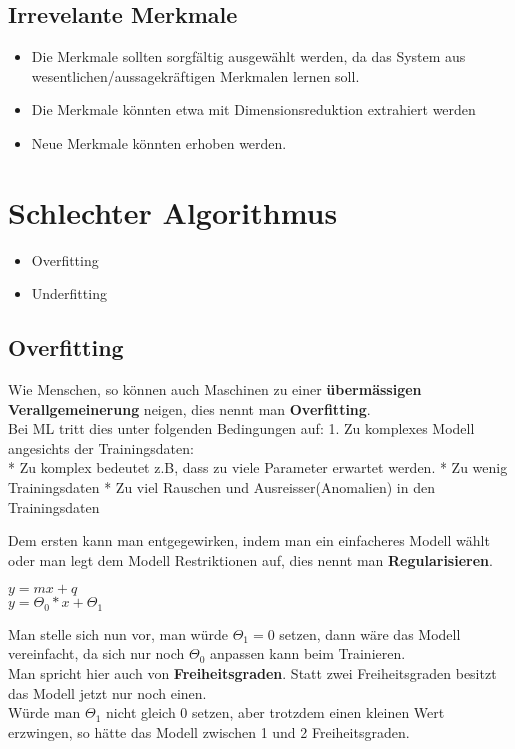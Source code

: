 \documentclass[11pt]{article}
\providecommand{\tightlist}{%
      \setlength{\itemsep}{0pt}\setlength{\parskip}{0pt}}
\begin{document}
\subsection{Irrevelante Merkmale}\label{irrevelante-merkmale}

\begin{itemize}
\tightlist
\item
  Die Merkmale sollten sorgfältig ausgewählt werden, da das System aus
  wesentlichen/aussagekräftigen Merkmalen lernen soll.\\
\item
  Die Merkmale könnten etwa mit Dimensionsreduktion extrahiert werden
\item
  Neue Merkmale könnten erhoben werden.
\end{itemize}

    \section{Schlechter Algorithmus}\label{schlechter-algorithmus}

\begin{itemize}
\tightlist
\item
  Overfitting
\item
  Underfitting
\end{itemize}

\subsection{Overfitting}\label{overfitting}

Wie Menschen, so können auch Maschinen zu einer \textbf{übermässigen
Verallgemeinerung} neigen, dies nennt man \textbf{Overfitting}.\\
Bei ML tritt dies unter folgenden Bedingungen auf: 1. Zu komplexes
Modell angesichts der Trainingsdaten:\\
* Zu komplex bedeutet z.B, dass zu viele Parameter erwartet werden. * Zu
wenig Trainingsdaten * Zu viel Rauschen und Ausreisser(Anomalien) in den
Trainingsdaten

Dem ersten kann man entgegewirken, indem man ein einfacheres Modell
wählt oder man legt dem Modell Restriktionen auf, dies nennt man
\textbf{Regularisieren}.

\(y=mx+q\)\\
\(y=\Theta_0*x+\Theta_1\)

Man stelle sich nun vor, man würde \(\Theta_1=0\) setzen, dann wäre das
Modell vereinfacht, da sich nur noch \(\Theta_0\) anpassen kann beim
Trainieren.\\
Man spricht hier auch von \textbf{Freiheitsgraden}. Statt zwei
Freiheitsgraden besitzt das Modell jetzt nur noch einen.\\
Würde man \(\Theta_1\) nicht gleich \(0\) setzen, aber trotzdem einen
kleinen Wert erzwingen, so hätte das Modell zwischen 1 und 2
Freiheitsgraden.
\end{document}
